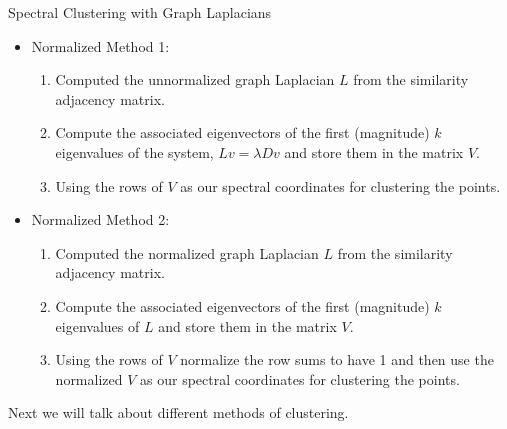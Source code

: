 \documentclass[xcolor=dvipsnames,t]{beamer} %
\begin{document}
\begin{frame}{Spectral Clustering with Graph Laplacians}
\begin{itemize}
\item Normalized Method 1:
\begin{enumerate}
\item Computed the unnormalized graph Laplacian $L$ from the similarity adjacency matrix.  
\item Compute the associated eigenvectors of the first (magnitude) $k$ eigenvalues of the system, $Lv = \lambda Dv$ and store them in the matrix $V$. 
\item Using the rows of $V$  as our spectral coordinates for clustering the points. 
\end{enumerate}

\item Normalized Method 2:
\begin{enumerate}
\item Computed the normalized graph Laplacian $L$ from the similarity adjacency matrix.  
\item Compute the associated eigenvectors of the first (magnitude) $k$ eigenvalues of $L$ and store them in the matrix $V$. 
\item Using the rows of $V$ normalize the row sums to have 1 and then use the normalized $V$ as our spectral  coordinates for clustering the points. 
\end{enumerate}
\end{itemize}
Next we will talk about different methods of clustering. 
\end{frame}
\end{document}
